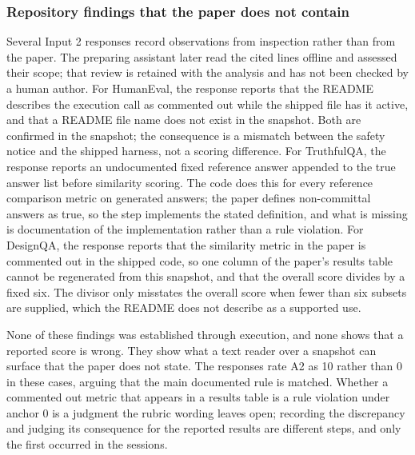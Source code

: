 \subsubsection{Repository findings that the paper does not contain}
Several Input 2 responses record observations from inspection rather than from the paper. The preparing assistant later read the cited lines offline and assessed their scope; that review is retained with the analysis and has not been checked by a human author. For HumanEval, the response reports that the README describes the execution call as commented out while the shipped file has it active, and that a README file name does not exist in the snapshot. Both are confirmed in the snapshot; the consequence is a mismatch between the safety notice and the shipped harness, not a scoring difference. For TruthfulQA, the response reports an undocumented fixed reference answer appended to the true answer list before similarity scoring. The code does this for every reference comparison metric on generated answers; the paper defines non-committal answers as true, so the step implements the stated definition, and what is missing is documentation of the implementation rather than a rule violation. For DesignQA, the response reports that the similarity metric in the paper is commented out in the shipped code, so one column of the paper's results table cannot be regenerated from this snapshot, and that the overall score divides by a fixed six. The divisor only misstates the overall score when fewer than six subsets are supplied, which the README does not describe as a supported use.

None of these findings was established through execution, and none shows that a reported score is wrong. They show what a text reader over a snapshot can surface that the paper does not state. The responses rate A2 as 10 rather than 0 in these cases, arguing that the main documented rule is matched. Whether a commented out metric that appears in a results table is a rule violation under anchor 0 is a judgment the rubric wording leaves open; recording the discrepancy and judging its consequence for the reported results are different steps, and only the first occurred in the sessions.
